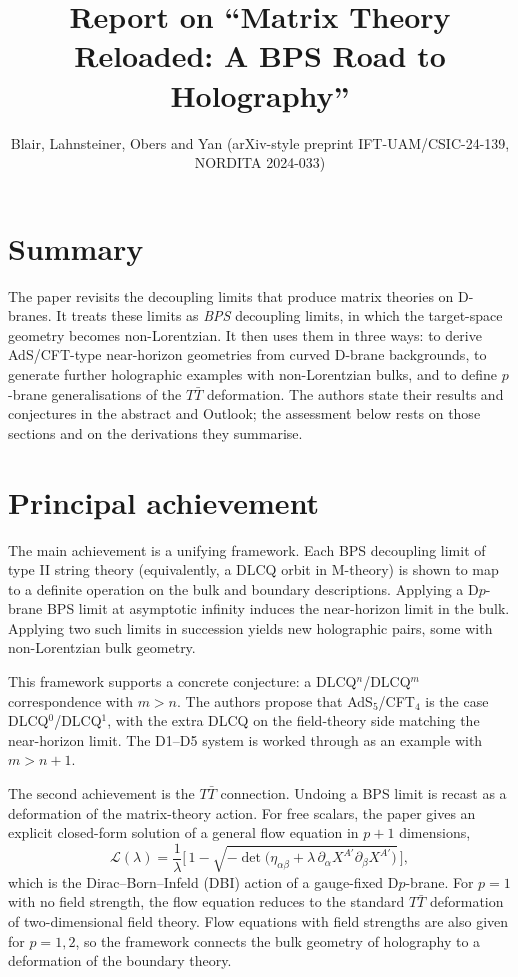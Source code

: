 \documentclass[11pt]{article}
\title{Report on ``Matrix Theory Reloaded: A BPS Road to Holography''}
\author{Blair, Lahnsteiner, Obers and Yan (arXiv-style preprint IFT-UAM/CSIC-24-139, NORDITA 2024-033)}
\date{}
\begin{document}
\maketitle

\section*{Summary}

The paper revisits the decoupling limits that produce matrix theories on D-branes. It treats these limits as \emph{BPS} decoupling limits, in which the target-space geometry becomes non-Lorentzian. It then uses them in three ways: to derive AdS/CFT-type near-horizon geometries from curved D-brane backgrounds, to generate further holographic examples with non-Lorentzian bulks, and to define $p$-brane generalisations of the $T\bar T$ deformation. The authors state their results and conjectures in the abstract and Outlook; the assessment below rests on those sections and on the derivations they summarise.

\section{Principal achievement}

The main achievement is a unifying framework. Each BPS decoupling limit of type II string theory (equivalently, a DLCQ orbit in M-theory) is shown to map to a definite operation on the bulk and boundary descriptions. Applying a D$p$-brane BPS limit at asymptotic infinity induces the near-horizon limit in the bulk. Applying two such limits in succession yields new holographic pairs, some with non-Lorentzian bulk geometry.

This framework supports a concrete conjecture: a DLCQ${}^n$/DLCQ${}^m$ correspondence with $m>n$. The authors propose that AdS${}_5$/CFT${}_4$ is the case DLCQ${}^0$/DLCQ${}^1$, with the extra DLCQ on the field-theory side matching the near-horizon limit. The D1--D5 system is worked through as an example with $m>n+1$.

The second achievement is the $T\bar T$ connection. Undoing a BPS limit is recast as a deformation of the matrix-theory action. For free scalars, the paper gives an explicit closed-form solution of a general flow equation in $p+1$ dimensions,
\begin{equation*}
\mathcal{L}(\lambda)=\frac{1}{\lambda}\Big[\,1-\sqrt{-\det\big(\eta_{\alpha\beta}+\lambda\,\partial_\alpha X^{A'}\partial_\beta X^{A'}\big)}\,\Big],
\end{equation*}
which is the Dirac--Born--Infeld (DBI) action of a gauge-fixed D$p$-brane. For $p=1$ with no field strength, the flow equation reduces to the standard $T\bar T$ deformation of two-dimensional field theory. Flow equations with field strengths are also given for $p=1,2$, so the framework connects the bulk geometry of holography to a deformation of the boundary theory.
\end{document}
